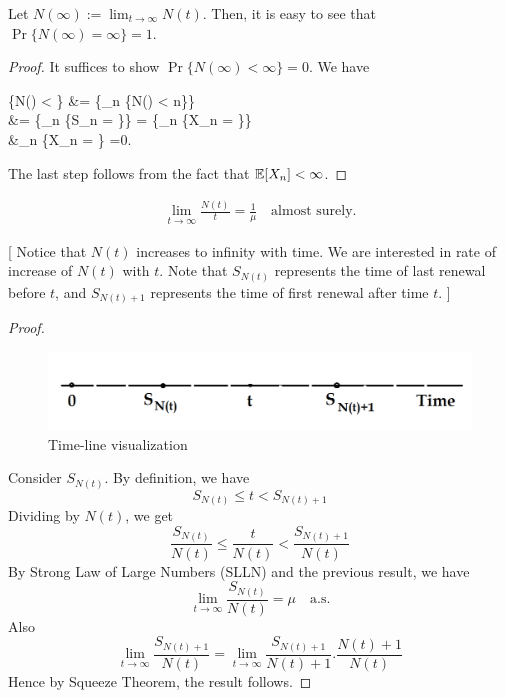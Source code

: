 \documentclass[a4paper,10pt, english]{article}
\begin{document}
\begin{lem}
	Let $N(\infty) := \lim_{t \to \infty} N(t)$. Then, it is easy to see that $\Pr\{N(\infty) = \infty\} = 1$.	
\end{lem}

\begin{proof}
	It suffices to show $\Pr\{N(\infty) < \infty\} = 0$. We have
	\begin{flalign*}
	\Pr\{N(\infty) < \infty\} &= \Pr\{\bigcup_{n \in \N} \{N(\infty) < n\}\}\\
	&= \Pr\{\bigcup_{n \in \N} \{S_n = \infty\}\} = \Pr\{\bigcup_{n \in \N} \{X_n = \infty\}\} \\
	&\leq \sum_{n \in \N}\Pr\{X_n = \infty\} =0.
	\end{flalign*}
	The last step follows from the fact that $\mathbb{E}[X_n] < \infty$.
\end{proof}

\begin{thm}
	\begin{align*}
	\lim_{t \to \infty} \frac{N(t)}{t} = \frac{1}{\mu} \quad \mbox{almost surely}.
	\end{align*}
\end{thm}
[
Notice that $N(t)$ increases to infinity with time. We are interested in rate of increase of $N(t)$ with $t$. Note that $S_{N(t)}$ represents the time of last renewal before $t$, and $S_{N(t)+1}$ represents the time of first renewal after time $t$. ] \\

\begin{proof}
	\begin{figure}[h!]
		\includegraphics[width=\linewidth]{Figures/lecture_5_fig_1.png}
		\caption{Time-line visualization}
	\end{figure}
	Consider $S_{N(t)}$. By definition, we have
	\[S_{N(t)} \leq t < S_{N(t)+1}\]
	Dividing by $N(t)$, we get 
	\[\frac{S_{N(t)}}{N(t)} \leq \frac{t}{N(t)} < \frac{S_{N(t)+1}}{N(t)}\]
	By Strong Law of Large Numbers (SLLN) and the previous result, we have
	\[\lim_{t \to \infty}\frac{S_{N(t)}}{N(t)} = \mu \quad \mbox{a.s.}\] 
	Also
	\[\lim_{t \to \infty} \frac{S_{N(t)+1}}{N(t)} = \lim_{t \to \infty} \frac{S_{N(t)+1}}{N(t)+1}.\frac{N(t)+1}{N(t)} \]
	Hence by Squeeze Theorem, the result follows.
\end{proof}
\end{document}
